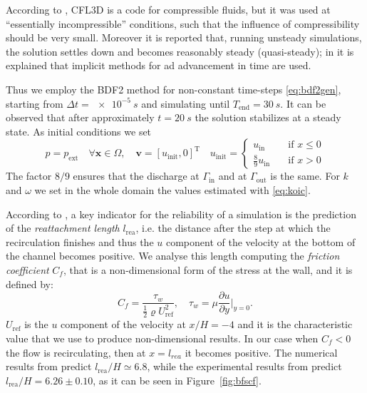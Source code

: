 According to \cite{web:nasa}, CFL3D is a code for compressible fluids, but it was used at ``essentially incompressible'' conditions, such that the influence of compressibility should be very small. Moreover it is reported that, running unsteady simulations, the solution settles down and becomes reasonably steady (quasi-steady); in \cite{bfs:cfl3d} it is explained that implicit methods for ad advancement in time are used.

Thus we employ the BDF2 method for non-constant time-steps \eqref{eq:bdf2gen}, starting from $\Delta t = \SI{e-5}{s}$ and simulating until $T_\text{end} = \SI{30}{s}$. It can be observed that after approximately $t=\SI{20}{s}$ the solution stabilizes at a steady state. As initial conditions we set
\begin{equation}
p=p_\text{ext} \quad \forall \mathbf{x} \in \Omega, \quad \mathbf{v} = [u_\text{init},0]^\mathrm{T} \quad u_\text{init} = \begin{cases}
u_\text{in} \quad&\text{if $x\leq 0$}\\
\frac{8}{9}u_\text{in} \quad&\text{if $x>0$}
\end{cases}
\end{equation}
The factor $8/9$ ensures that the discharge at $\Gamma_\text{in}$ and at $\Gamma_\text{out}$ is the same. For $k$ and $\omega$ we set in the whole domain the values estimated with \eqref{eq:koic}.

According to \cite{web:nasa}, a key indicator for the reliability of a simulation is the prediction of the \emph{reattachment length} $l_\text{rea}$, i.e. the distance after the step at which the recirculation finishes and thus the $u$ component of the velocity at the bottom of the channel becomes positive. We analyse this length computing the \emph{friction coefficient} $C_f$, that is a non-dimensional form of the stress at the wall, and it is defined by:
\begin{equation}
C_f = \frac{\tau_w}{\frac{1}{2}\varrho U_\text{ref}^2}, \quad \tau_w = \mu \frac{\partial u}{\partial y} \Big|_{y=0}.
\end{equation}
$U_\text{ref}$ is the $u$ component of the velocity at $x/H=-4$ and it is the characteristic value that we use to produce non-dimensional results. In our case when $C_f<0$ the flow is recirculating, then at $x=l_{rea}$ it becomes positive. The numerical results from \cite{web:nasa} predict $l_\text{rea}/H \simeq 6.8$, while the experimental results from \cite{bfs:driver} predict $l_\text{rea}/H = 6.26 \pm 0.10$, as it can be seen in Figure~\ref{fig:bfscf}.

